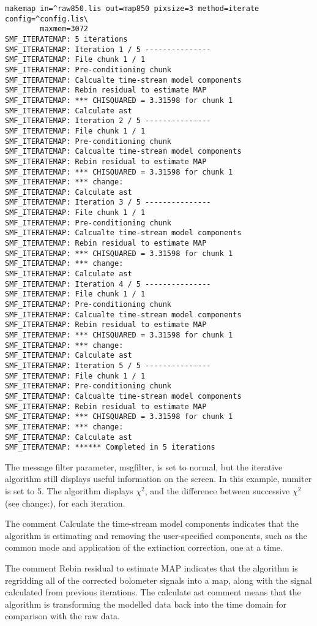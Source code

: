 \documentclass[twoside,11pt]{article}
\renewcommand{\_}{\texttt{\symbol{95}}}
\begin{document}
\begin{verbatim}
makemap in=^raw850.lis out=map850 pixsize=3 method=iterate config=^config.lis\
        maxmem=3072
SMF_ITERATEMAP: 5 iterations
SMF_ITERATEMAP: Iteration 1 / 5 ---------------
SMF_ITERATEMAP: File chunk 1 / 1
SMF_ITERATEMAP: Pre-conditioning chunk
SMF_ITERATEMAP: Calcualte time-stream model components
SMF_ITERATEMAP: Rebin residual to estimate MAP
SMF_ITERATEMAP: *** CHISQUARED = 3.31598 for chunk 1
SMF_ITERATEMAP: Calculate ast
SMF_ITERATEMAP: Iteration 2 / 5 ---------------
SMF_ITERATEMAP: File chunk 1 / 1
SMF_ITERATEMAP: Pre-conditioning chunk
SMF_ITERATEMAP: Calcualte time-stream model components
SMF_ITERATEMAP: Rebin residual to estimate MAP
SMF_ITERATEMAP: *** CHISQUARED = 3.31598 for chunk 1
SMF_ITERATEMAP: *** change: 
SMF_ITERATEMAP: Calculate ast
SMF_ITERATEMAP: Iteration 3 / 5 ---------------
SMF_ITERATEMAP: File chunk 1 / 1
SMF_ITERATEMAP: Pre-conditioning chunk
SMF_ITERATEMAP: Calcualte time-stream model components
SMF_ITERATEMAP: Rebin residual to estimate MAP
SMF_ITERATEMAP: *** CHISQUARED = 3.31598 for chunk 1
SMF_ITERATEMAP: *** change: 
SMF_ITERATEMAP: Calculate ast
SMF_ITERATEMAP: Iteration 4 / 5 ---------------
SMF_ITERATEMAP: File chunk 1 / 1
SMF_ITERATEMAP: Pre-conditioning chunk
SMF_ITERATEMAP: Calcualte time-stream model components
SMF_ITERATEMAP: Rebin residual to estimate MAP
SMF_ITERATEMAP: *** CHISQUARED = 3.31598 for chunk 1
SMF_ITERATEMAP: *** change: 
SMF_ITERATEMAP: Calculate ast
SMF_ITERATEMAP: Iteration 5 / 5 ---------------
SMF_ITERATEMAP: File chunk 1 / 1
SMF_ITERATEMAP: Pre-conditioning chunk
SMF_ITERATEMAP: Calcualte time-stream model components
SMF_ITERATEMAP: Rebin residual to estimate MAP
SMF_ITERATEMAP: *** CHISQUARED = 3.31598 for chunk 1
SMF_ITERATEMAP: *** change: 
SMF_ITERATEMAP: Calculate ast
SMF_ITERATEMAP: ****** Completed in 5 iterations
\end{verbatim}

The message filter parameter, msg\_filter, is set to normal, but the
iterative algorithm still displays useful information on the
screen. In this example, numiter is set to 5. The algorithm displays
$\chi^2$, and the difference between successive $\chi^2$ (see
change:), for each iteration.

The comment Calculate the time-stream model components indicates that
the algorithm is estimating and removing the user-specified
components, such as the common mode and application of the extinction
correction, one at a time.

The comment Rebin residual to estimate MAP indicates that the
algorithm is regridding all of the corrected bolometer signals into a
map, along with the signal calculated from previous iterations.  The
calculate ast comment means that the algorithm is transforming the
modelled data back into the time domain for comparison with the raw
data.
\end{document}
